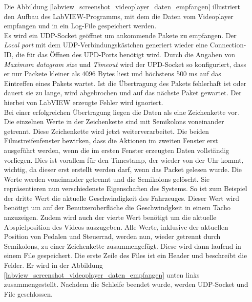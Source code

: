 Die Abbildung \ref{labview_screenshot_videoplayer_daten_empfangen} illustriert den Aufbau des LabVIEW-Programms, mit dem die Daten vom Videoplayer empfangen und in ein Log-File gespeichert werden.\\
Es wird ein UDP-Socket geöffnet um ankommende Pakete zu empfangen. Der \textit{Local port} mit dem UDP-Verbindungskästchen generiert wieder eine Connection-ID, die für das Öffnen des UPD-Ports benötigt wird. Durch die Angaben von \textit{Maximum datagram size} und \textit{Timeout} wird der UPD-Socket so konfiguriert, dass er nur Packete kleiner als 4096 Bytes liest und höchstens 500 ms auf das Eintreffen eines Pakets wartet. Ist die Übertragung des Pakets fehlerhaft ist oder dauert sie zu lange, wird abgebrochen und auf das nächste Paket gewartet. Der hierbei von LabVIEW erzeugte Fehler wird ignoriert.\\
Bei einer erfolgreichen Übertragung liegen die Daten als eine Zeichenkette vor. Die einzelnen Werte in der Zeichenkette sind mit Semikolons voneinander getrennt. Diese Zeichenkette wird jetzt weiterverarbeitet. Die beiden Filmstreifenfenster bewirken, dass die Aktionen im zweiten Fenster erst ausgeführt werden, wenn die im ersten Fenster erzeugten Daten vollständig vorliegen. Dies ist vorallem für den Timestamp, der wieder von der Uhr kommt, wichtig, da dieser erst erstellt werden darf, wenn das Packet gelesen wurde. Die Werte werden voneinander getrennt und die Semikolons gelöscht. Sie repräsentieren nun verschiedenste Eigenschaften des Systems. So ist zum Beispiel der dritte Wert die aktuelle Geschwindigkeit des Fahrzeuges. Dieser Wert wird benötigt um auf der Benutzeroberfläche die Geschwindgkeit in einem Tacho anzuzeigen. Zudem wird auch der vierte Wert benötigt um die aktuelle Abspielposition des Videos auszugeben. Alle Werte, inklusive der aktuellen Position von Pedalen und Steuerrad, werden nun, wieder getrennt durch Semikolons, zu einer Zeichenkette zusammengefügt. Diese wird dann laufend in einem File gespeichert. Die erste Zeile des Files ist ein Header und beschreibt die Felder. Er wird in der Abbildung \ref{labview_screenshot_videoplayer_daten_empfangen} unten links zusammengestellt. Nachdem die Schleife beendet wurde, werden UDP-Socket und File geschlossen.

\newpage

